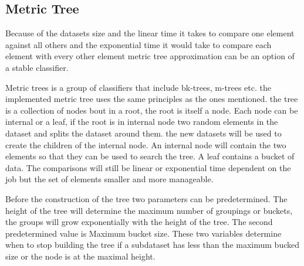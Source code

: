 \subsection{Metric Tree}
Because of the datasets size and the linear time it takes to compare one element against all others and the exponential time it would take to compare each element with every other element metric tree approximation can be an option of a stable  classifier. 

Metric trees is a group of classifiers that include bk-trees, m-trees etc. the implemented metric tree uses the same principles as the ones mentioned. the tree is a collection of nodes bout in a root, the root is itself a node. Each node can be internal or a leaf, if the root is in internal node two random elements in the dataset and splits the dataset around them. the new datasets will be used to create the children of the internal node. An internal node will contain the two elements so that they can be used to search the tree. A leaf contains a bucket of data. The comparisons will still be linear or exponential time dependent on the job but the set of elements smaller and more manageable.

Before the construction of the tree two parameters can be predetermined. The height of the tree will determine the maximum number of  groupings or buckets, the groups will grow exponentially with the height of the tree. The second predetermined value is Maximum bucket size. These two variables determine when to stop building the tree if a subdataset has less than the maximum bucked size or the node is at the maximal height.